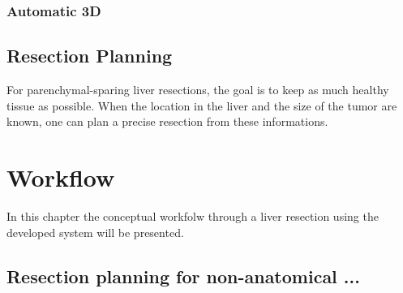 \subsubsection{Automatic 3D}

\subsection{Resection Planning}
For parenchymal-sparing liver resections, the goal is to keep as much healthy tissue as
possible. When the location in the liver and the size of the tumor are known, one can plan a
precise resection from these informations.

\section{Workflow}
In this chapter the conceptual workfolw through a liver resection using the
developed system will be presented.
\subsection{Resection planning for non-anatomical ...}

